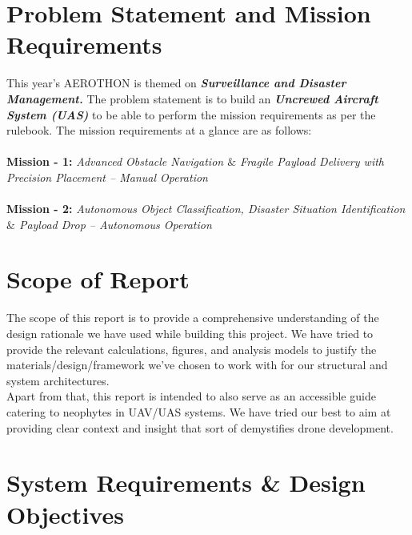 \documentclass[12pt]{report}
\begin{document}
    \section{Problem Statement and Mission Requirements}
    This year's AEROTHON is themed on \textbf{\textit{Surveillance and Disaster Management.}} The problem statement is to build an \textbf{\textit{Uncrewed Aircraft System (UAS)}} to be able to perform the mission requirements as per the rulebook. The mission requirements at a glance are as follows: \\ \\
    \textbf{Mission - 1:} \textit{Advanced Obstacle Navigation $\&$ Fragile Payload Delivery with Precision Placement – Manual Operation} \\ \\
    \textbf{Mission - 2:} \textit{Autonomous Object Classification, Disaster Situation Identification $\&$ Payload Drop – Autonomous Operation} 



    \section{Scope of Report}
    The scope of this report is to provide a comprehensive understanding of the design rationale we have used while building this project. We have tried to provide the relevant calculations, figures, and analysis models to justify the materials/design/framework we've chosen to work with for our structural and system architectures. \\ 

    \noindent Apart from that, this report is intended to also serve as an accessible guide catering to neophytes in UAV/UAS systems. We have tried our best to aim at providing clear context and insight that sort of demystifies drone development. \\

  \section{System Requirements \& Design Objectives}
\end{document}
